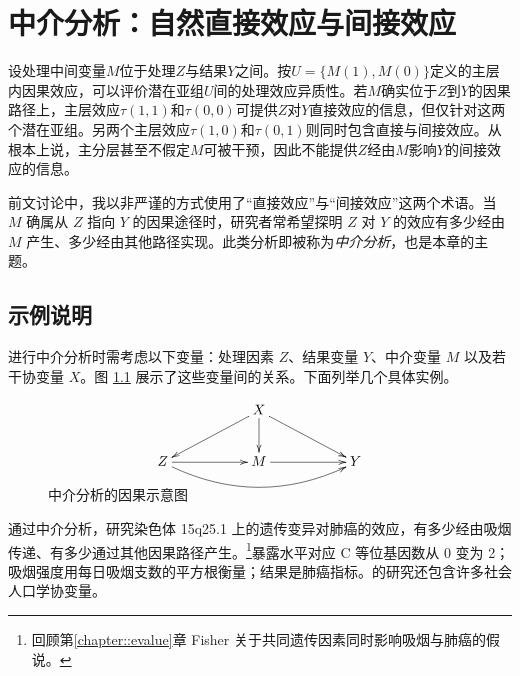  
\chapter{中介分析：自然直接效应与间接效应}
 \label{chapter::mediation}




设处理中间变量$M$位于处理$Z$与结果$Y$之间。按$U = \{  M(1), M(0) \}$定义的主层内因果效应，可以评价潜在亚组$U$间的处理效应异质性。若$M$确实位于$Z$到$Y$的因果路径上，主层效应$\tau(1,1)$和$ \tau(0,0)$可提供$Z$对$Y$直接效应的信息，但仅针对这两个潜在亚组。另两个主层效应$\tau(1,0)$和$ \tau(0,1)$则同时包含直接与间接效应。从根本上说，主分层甚至不假定$M$可被干预，因此不能提供$Z$经由$M$影响$Y$的间接效应的信息。 



前文讨论中，我以非严谨的方式使用了“直接效应”与“间接效应”这两个术语。当 $M$ 确属从 $Z$ 指向 $Y$ 的因果途径时，研究者常希望探明 $Z$ 对 $Y$ 的效应有多少经由 $M$ 产生、多少经由其他路径实现。此类分析即被称为{\it 中介分析}，也是本章的主题。 



\section{示例说明}





进行中介分析时需考虑以下变量：处理因素 $Z$、结果变量 $Y$、中介变量 $M$ 以及若干协变量 $X$。图 \ref{fg::mediationDAG} 展示了这些变量间的关系。下面列举几个具体实例。 



\begin{figure}[ht]
\centering
$$
\begin{xy}
\xymatrix{
&& X \ar[dll] \ar[d] \ar[drr] \\
Z \ar[rr] \ar@/_1.5pc/[rrrr] & & M\ar[rr] & & Y}
\end{xy}
$$
\caption{中介分析的因果示意图}\label{fg::mediationDAG}
\end{figure}


\begin{example}
\citet{Vanderweele::2012genetic}通过中介分析，研究染色体 15q25.1 上的遗传变异对肺癌的效应，有多少经由吸烟传递、有多少通过其他因果路径产生。\footnote{回顾第\ref{chapter::evalue}章 Fisher 关于共同遗传因素同时影响吸烟与肺癌的假说。}暴露水平对应 C 等位基因数从 0 变为 2；吸烟强度用每日吸烟支数的平方根衡量；结果是肺癌指标。\citet{Vanderweele::2012genetic}的研究还包含许多社会人口学协变量。  %
\end{example}



